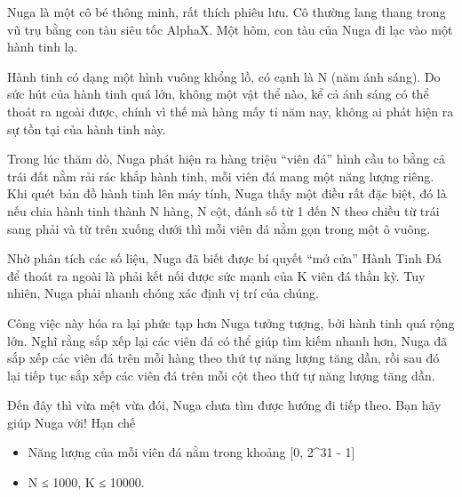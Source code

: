 Nuga là một cô bé thông minh, rất thích phiêu lưu. Cô thường lang thang trong vũ trụ bằng con tàu siêu tốc AlphaX. Một hôm, con tàu của Nuga đi lạc vào một hành tinh lạ.  

   Hành tinh có dạng một hình vuông khổng lồ, có cạnh là N (năm ánh sáng). Do sức hút của hành tinh quá lớn, không một vật thể nào, kể cả ánh sáng có thể thoát ra ngoài được, chính vì thế mà hàng mấy tỉ năm nay, không ai phát hiện ra sự tồn tại của hành tinh này.  

   Trong lúc thăm dò, Nuga phát hiện ra hàng triệu “viên đá” hình cầu to bằng cả trái đất nằm rải rác khắp hành tinh, mỗi viên đá mang một năng lượng riêng. Khi quét bản đồ hành tinh lên máy tính, Nuga thấy một điều rất đặc biệt, đó là nếu chia hành tinh thành N hàng, N cột, đánh số từ 1 đến N theo chiều từ trái sang phải và từ trên xuống dưới thì mỗi viên đá nằm gọn trong một ô vuông.  

   Nhờ phân tích các số liệu, Nuga đã biết được bí quyết “mở cửa” Hành Tinh Đá để thoát ra ngoài là phải kết nối được sức mạnh của K viên đá thần kỳ. Tuy nhiên, Nuga phải nhanh chóng xác định vị trí của chúng.  

   Công việc này hóa ra lại phức tạp hơn Nuga tưởng tượng, bởi hành tinh quá rộng lớn. Nghĩ rằng sắp xếp lại các viên đá có thể giúp tìm kiếm nhanh hơn, Nuga đã sắp xếp các viên đá trên mỗi hàng theo thứ tự năng lượng tăng dần, rồi sau đó lại tiếp tục sắp xếp các viên đá trên mỗi cột theo thứ tự năng lượng tăng dần.  

   Đến đây thì vừa mệt vừa đói, Nuga chưa tìm được hướng đi tiếp theo. Bạn hãy giúp Nuga với!
Hạn chế
\begin{itemize}
	\item     Năng lượng của mỗi viên đá nằm trong khoảng [0, 2^31 - 1]   
	\item     N ≤ 1000, K ≤ 10000.   
\end{itemize}